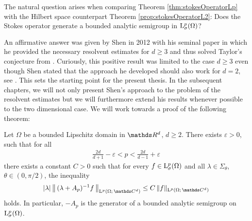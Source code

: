 The natural question arises when comparing Theorem \ref{thm:stokesOperatorLp} with the Hilbert space counterpart Theorem \ref{prop:stokesOperatorL2}: Does the Stokes operator generate a bounded analytic semigroup in $\mathrm{L}^p_\sigma(\Omega)$?

An affirmative answer was given by Shen in 2012 with his seminal paper \cite{Shen2012} in which he provided the necessary resolvent estimates for $d \geq 3$ and thus solved Taylor's conjecture from \cite{taylor}. 
Curiously, this positive result was limited to the case $d \geq 3$ even though Shen stated that the approach he developed should also work for $d = 2$, see \cite[p.\@~399]{Shen2012}.
This sets the starting point for the present thesis.
In the subsequent chapters, we will not only present Shen's approach to the problem of the resolvent estimates but we will furthermore extend his results whenever possible to the two dimensional case.
We will work towards a proof of the following theorem:

\begin{thm}
  \label{thm:main}
  Let $\Omega$ be a bounded Lipschitz domain in $\R^d$, $d \geq 2$.
  There exists $\varepsilon > 0$, such that for all
  \begin{align*}
    \frac{2d}{d + 1} - \varepsilon < p < \frac{2d}{d - 1} + \varepsilon
  \end{align*}
  there exists a constant $C > 0$ such that for every $f \in \mathrm{L}^p_\sigma(\Omega)$ and all $\lambda \in \Sigma_\theta$, $\theta \in (0,\pi/2)$, the inequality
  \begin{align*}
    |\lambda|\, \big\| \, (\lambda + A_p)^{-1} f\, \big\|_{\Ell^p(\Omega; \,\C^d)} 
    \leq C\, \|f\|_{\Ell^p(\Omega;\, \C^d)}
  \end{align*}
  holds. In particular, $-A_p$ is the generator of a bounded analytic semigroup on $\mathrm{L}^p_\sigma(\Omega)$.
\end{thm}

